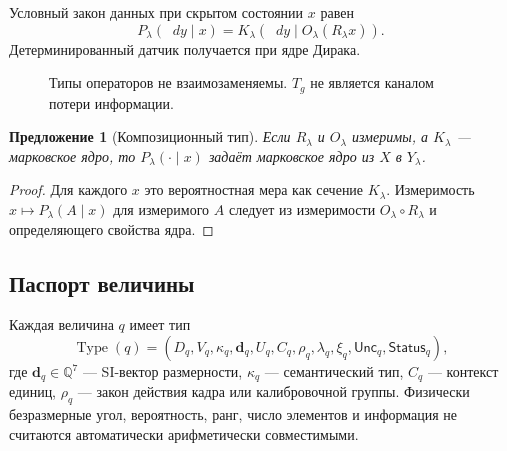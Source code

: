 \documentclass[11pt,a4paper]{article}
\theoremstyle{definition}
\theoremstyle{plain}
\newtheorem{proposition}[definition]{Предложение}
\theoremstyle{remark}
\newcommand{\dd}{\mathop{}\!d}
\newcommand{\Type}{\operatorname{Type}}
\begin{document}
Условный закон данных при скрытом состоянии $x$ равен
\[
P_\lambda(\dd y\mid x)
=K_\lambda\!\left(\dd y\mid
O_\lambda(R_\lambda x)\right).
\]
Детерминированный датчик получается при ядре Дирака.

\begin{figure}[htbp]
\centering
{}
\caption{Типы операторов не взаимозаменяемы. $T_g$ не является каналом
потери информации.}
\end{figure}

\begin{proposition}[Композиционный тип]
Если $R_\lambda$ и $O_\lambda$ измеримы, а $K_\lambda$ --- марковское
ядро, то $P_\lambda(\cdot\mid x)$ задаёт марковское ядро из $X$ в
$Y_\lambda$.
\end{proposition}
\begin{proof}
Для каждого $x$ это вероятностная мера как сечение $K_\lambda$.
Измеримость $x\mapsto P_\lambda(A\mid x)$ для измеримого $A$ следует из
измеримости $O_\lambda\circ R_\lambda$ и определяющего свойства ядра.
\end{proof}

\subsection{Паспорт величины}

Каждая величина $q$ имеет тип
\[
\Type(q)=
(D_q,V_q,\kappa_q,\bm d_q,U_q,C_q,\rho_q,\lambda_q,\xi_q,
\mathsf{Unc}_q,\mathsf{Status}_q),
\]
где $\bm d_q\in\mathbb Q^7$ --- SI-вектор размерности, $\kappa_q$ ---
семантический тип, $C_q$ --- контекст единиц, $\rho_q$ --- закон действия
кадра или калибровочной группы. Физически безразмерные угол, вероятность,
ранг, число элементов и информация не считаются автоматически
арифметически совместимыми.
\end{document}
